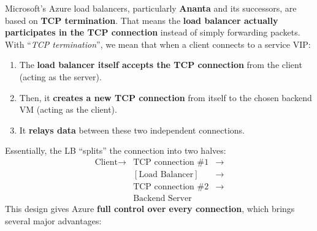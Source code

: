 \highspace
Microsoft's Azure load balancers, particularly \textbf{Ananta} and its successors, are based on \textbf{TCP termination}. That means the \textbf{load balancer actually participates in the TCP connection} instead of simply forwarding packets. With ``\emph{TCP termination}'', we mean that when a client connects to a service VIP:
\begin{enumerate}
    \item The \textbf{load balancer itself accepts the TCP connection} from the client (acting as the server).
    \item Then, it \textbf{creates a new TCP connection} from itself to the chosen backend VM (acting as the client).
    \item It \textbf{relays data} between these two independent connections.
\end{enumerate}
Essentially, the LB ``splits'' the connection into two halves:
\begin{equation*}
    \begin{array}{rll}
        \text{Client} \longrightarrow & \text{TCP connection \#1} & \longrightarrow \\[.5em]
        & [\text{Load Balancer}] & \longrightarrow \\[.5em]
        & \text{TCP connection \#2} & \longrightarrow \\[.5em]
        & \text{Backend Server} &
    \end{array}
\end{equation*}
This design gives Azure \textbf{full control over every connection}, which brings several major advantages:
